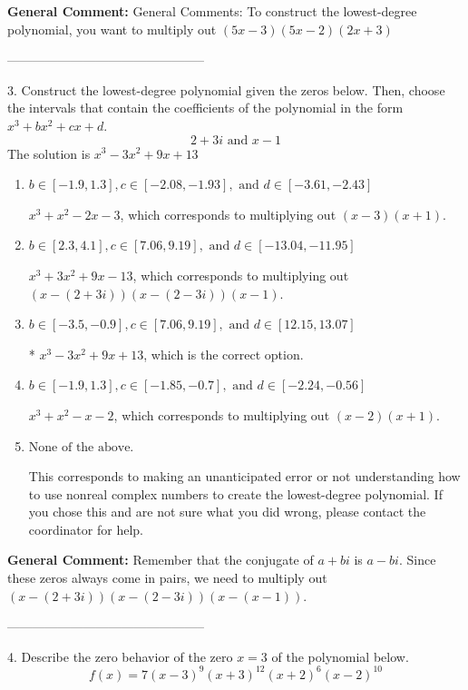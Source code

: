 \documentclass{extbook}[14pt]
\begin{document}
\textbf{General Comment:} General Comments: To construct the lowest-degree polynomial, you want to multiply out $(5x -3)(5x -2)(2x + 3)$ 

-----------------------------------------------

3. Construct the lowest-degree polynomial given the zeros below. Then, choose the intervals that contain the coefficients of the polynomial in the form $x^3+bx^2+cx+d$.
\[ 2 + 3 i \text{ and } x -1 \] 
The solution is $ x^{3} -3 x^{2} +9 x + 13 $ 

\begin{enumerate}[label=\Alph*.] 
\item $ b \in [-1.9, 1.3], c \in [-2.08, -1.93], \text{ and } d \in [-3.61, -2.43] $ 

 $x^{3} + x^{2} -2 x -3$, which corresponds to multiplying out $(x -3)(x + 1)$. 
\item $ b \in [2.3, 4.1], c \in [7.06, 9.19], \text{ and } d \in [-13.04, -11.95] $ 

 $x^{3} +3 x^{2} +9 x -13$, which corresponds to multiplying out $(x-(2 + 3 i))(x-(2 - 3 i))(x -1)$. 
\item $ b \in [-3.5, -0.9], c \in [7.06, 9.19], \text{ and } d \in [12.15, 13.07] $ 

 * $x^{3} -3 x^{2} +9 x + 13$, which is the correct option. 
\item $ b \in [-1.9, 1.3], c \in [-1.85, -0.7], \text{ and } d \in [-2.24, -0.56] $ 

 $x^{3} + x^{2} -x -2$, which corresponds to multiplying out $(x -2)(x + 1)$. 
\item $ \text{None of the above.} $ 

 This corresponds to making an unanticipated error or not understanding how to use nonreal complex numbers to create the lowest-degree polynomial. If you chose this and are not sure what you did wrong, please contact the coordinator for help. 
\end{enumerate} 
 
\textbf{General Comment:} Remember that the conjugate of $a+bi$ is $a-bi$. Since these zeros always come in pairs, we need to multiply out $(x-(2 + 3 i))(x-(2 - 3 i))(x-(x -1))$. 

-----------------------------------------------

4. Describe the zero behavior of the zero $x = 3$ of the polynomial below.
\[ f(x) = 7(x - 3)^{9}(x + 3)^{12}(x + 2)^{6}(x - 2)^{10} \] 
\end{document}
